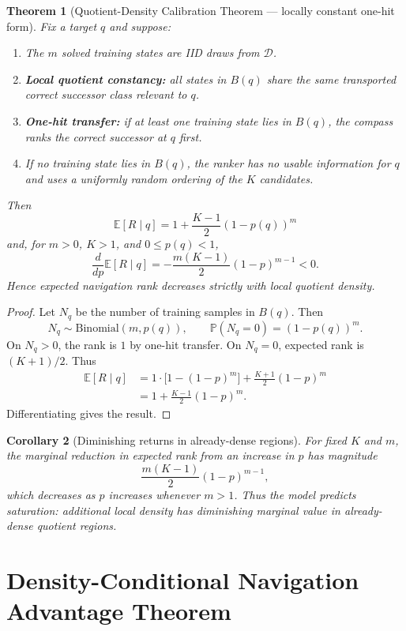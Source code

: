 \documentclass[11pt]{article}
\newtheorem{theorem}{Theorem}[section]
\newtheorem{corollary}[theorem]{Corollary}
\newcommand{\Prob}{\mathbb{P}}
\newcommand{\E}{\mathbb{E}}
\newcommand{\Dcal}{\mathcal{D}}
\begin{document}
\begin{theorem}[Quotient-Density Calibration Theorem --- locally constant one-hit form]
\label{thm:density}
Fix a target $q$ and suppose:
\begin{enumerate}[label=(Q\arabic*),leftmargin=2.7em]
\item The $m$ solved training states are IID draws from $\Dcal$.
\item \textbf{Local quotient constancy:} all states in $B(q)$ share the same transported correct successor class relevant to $q$.
\item \textbf{One-hit transfer:} if at least one training state lies in $B(q)$, the compass ranks the correct successor at $q$ first.
\item If no training state lies in $B(q)$, the ranker has no usable information for $q$ and uses a uniformly random ordering of the $K$ candidates.
\end{enumerate}
Then
\[
\boxed{
\E[R\mid q]
=1+\frac{K-1}{2}(1-p(q))^m
}
\]
and, for $m>0$, $K>1$, and $0\le p(q)<1$,
\[
\frac{d}{dp}\E[R\mid q]
=-\frac{m(K-1)}{2}(1-p)^{m-1}<0.
\]
Hence expected navigation rank decreases strictly with local quotient density.
\end{theorem}

\begin{proof}
Let $N_q$ be the number of training samples in $B(q)$. Then
\[
N_q\sim\mathrm{Binomial}(m,p(q)),
\qquad
\Prob(N_q=0)=(1-p(q))^m.
\]
On $N_q>0$, the rank is $1$ by one-hit transfer. On $N_q=0$, expected rank is $(K+1)/2$. Thus
\begin{align*}
\E[R\mid q]
&=1\cdot\bigl[1-(1-p)^m\bigr]
+\frac{K+1}{2}(1-p)^m\\
&=1+\frac{K-1}{2}(1-p)^m.
\end{align*}
Differentiating gives the result.
\end{proof}

\begin{corollary}[Diminishing returns in already-dense regions]
For fixed $K$ and $m$, the marginal reduction in expected rank from an increase in $p$ has magnitude
\[
\frac{m(K-1)}{2}(1-p)^{m-1},
\]
which decreases as $p$ increases whenever $m>1$. Thus the model predicts saturation: additional local density has diminishing marginal value in already-dense quotient regions.
\end{corollary}

\section{Density-Conditional Navigation Advantage Theorem}
\end{document}
